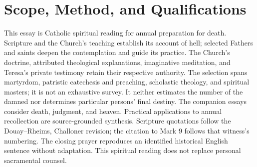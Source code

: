 \section{Scope, Method, and Qualifications}
This essay is Catholic spiritual reading for annual preparation for death. Scripture and the Church's teaching establish its account of hell; selected Fathers and saints deepen the contemplation and guide its practice. The Church's doctrine, attributed theological explanations, imaginative meditation, and Teresa's private testimony retain their respective authority. The selection spans martyrdom, patristic catechesis and preaching, scholastic theology, and spiritual masters; it is not an exhaustive survey. It neither estimates the number of the damned nor determines particular persons' final destiny. The companion essays consider death, judgment, and heaven. Practical applications to annual recollection are source-grounded synthesis. Scripture quotations follow the Douay--Rheims, Challoner revision; the citation to Mark 9 follows that witness's numbering. The closing prayer reproduces an identified historical English sentence without adaptation. This spiritual reading does not replace personal sacramental counsel.
